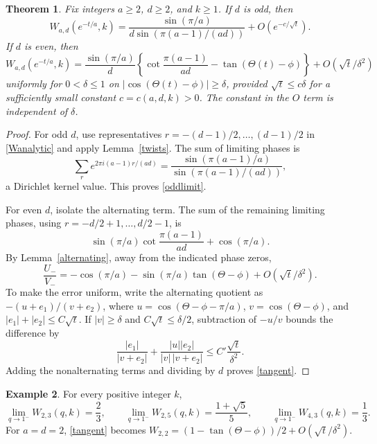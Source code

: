 \documentclass[11pt]{amsart}
\newtheorem{theorem}{Theorem}[section]
\theoremstyle{definition}
\newtheorem{example}[theorem]{Example}
\theoremstyle{remark}
\numberwithin{equation}{section}
\begin{document}
\begin{theorem}\label{radial}
Fix integers $a\ge2$, $d\ge2$, and $k\ge1$. If $d$ is odd, then
\begin{equation}\label{oddlimit}
 W_{a,d}(e^{-t/a},k)
 =\frac{\sin(\pi/a)}{d\sin(\pi(a-1)/(ad))}
       +O(e^{-c/\sqrt t}).
\end{equation}
If $d$ is even, then
\begin{equation}\label{tangent}
 W_{a,d}(e^{-t/a},k)
 =\frac{\sin(\pi/a)}d
   \left\{\cot\frac{\pi(a-1)}{ad}-\tan(\Theta(t)-\phi)\right\}
       +O(\sqrt t/\delta^2)
\end{equation}
uniformly for $0<\delta\le1$ on $|\cos(\Theta(t)-\phi)|\ge\delta$, provided $\sqrt t\le c\delta$ for a sufficiently small constant $c=c(a,d,k)>0$. The constant in the $O$ term is independent of $\delta$.
\end{theorem}
\begin{proof}
For odd $d$, use representatives $r=-(d-1)/2,\ldots,(d-1)/2$ in \eqref{Wanalytic} and apply Lemma~\ref{twists}. The sum of limiting phases is
\[
 \sum_r e^{2\pi i(a-1)r/(ad)}
 =\frac{\sin(\pi(a-1)/a)}{\sin(\pi(a-1)/(ad))},
\]
a Dirichlet kernel value. This proves \eqref{oddlimit}.

For even $d$, isolate the alternating term. The sum of the remaining limiting phases, using $r=-d/2+1,\ldots,d/2-1$, is
\[
 \sin(\pi/a)\cot\frac{\pi(a-1)}{ad}+\cos(\pi/a).
\]
By Lemma~\ref{alternating}, away from the indicated phase zeros,
\[
 \frac{U_-}{V_-}
 =-\cos(\pi/a)-\sin(\pi/a)\tan(\Theta-\phi)+O(\sqrt t/\delta^2).
\]
To make the error uniform, write the alternating quotient as $-(u+e_1)/(v+e_2)$, where $u=\cos(\Theta-\phi-\pi/a)$, $v=\cos(\Theta-\phi)$, and $|e_1|+|e_2|\le C\sqrt t$. If $|v|\ge\delta$ and $C\sqrt t\le\delta/2$, subtraction of $-u/v$ bounds the difference by
\[
 \frac{|e_1|}{|v+e_2|}
 +\frac{|u||e_2|}{|v|\,|v+e_2|}
 \le C'\frac{\sqrt t}{\delta^2}.
\]
Adding the nonalternating terms and dividing by $d$ proves \eqref{tangent}.
\end{proof}

\begin{example}
For every positive integer $k$,
\[
 \lim_{q\to1^-}W_{2,3}(q,k)=\frac23,\qquad
 \lim_{q\to1^-}W_{2,5}(q,k)=\frac{1+\sqrt5}{5},\qquad
 \lim_{q\to1^-}W_{4,3}(q,k)=\frac13.
\]
For $a=d=2$, \eqref{tangent} becomes $W_{2,2}=(1-\tan(\Theta-\phi))/2+O(\sqrt t/\delta^2)$.
\end{example}
\end{document}
